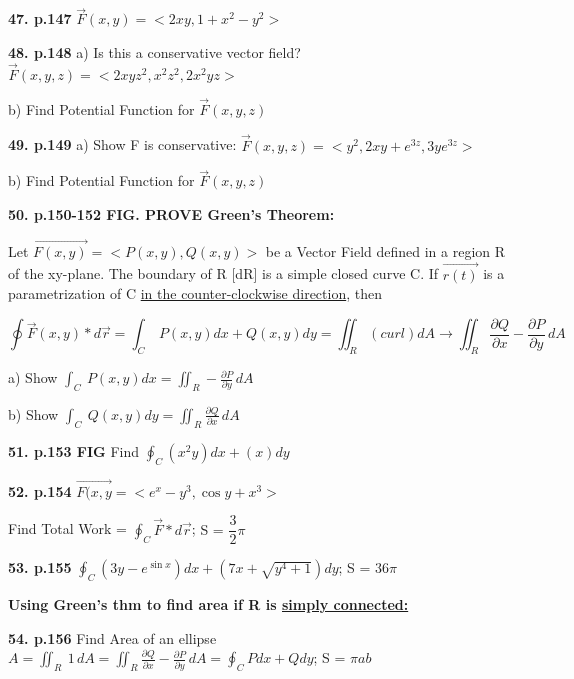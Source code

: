 \documentclass{article}
\begin{document}
\vspace{5mm}
\textbf{47. p.147} $\Vec{F}(x,y)=<2xy,1+x^2-y^2>$

\vspace{5mm}
\textbf{48. p.148} a) Is this a conservative vector field? $\Vec{F}(x,y,z)=<2xyz^2,x^2z^2,2x^2yz>$

b) Find Potential Function for $\Vec{F}(x,y,z)$

\vspace{5mm}
\textbf{49. p.149} a) Show F is conservative: $\Vec{F}(x,y,z)=<y^2,2xy+e^{3z},3ye^{3z}>$

b) Find Potential Function for $\Vec{F}(x,y,z)$

\vspace{15mm}
{\Large \textbf{50. p.150-152 FIG. PROVE Green's Theorem:}}

Let $\Vec{F(x,y)} = <P(x,y), Q(x,y)>$ be a Vector Field defined in a region R of the xy-plane. The boundary of R [dR] is a simple closed curve C. If \(\Vec{r(t)}\) is a parametrization of C \underline{in the counter-clockwise direction}, then

$$ \oint \Vec{F}(x,y) * d\Vec{r} = \int_C \ P(x,y)dx + Q(x,y)dy = \iint_R (curl) dA \xrightarrow{} \iint_R \frac{\partial Q}{\partial x} - \frac{\partial P}{\partial y} \,dA $$

\vspace{5mm}
a) Show $ \int_C \ P(x,y)dx = \iint_R - \frac{\partial P}{\partial y} \,dA$

\vspace{5mm}
b) Show $ \int_C \ Q(x,y)dy = \iint_R \frac{\partial Q}{\partial x} \,dA$

\vspace{5mm}
\textbf{51. p.153 FIG} Find $ \oint_C (x^2y)dx + (x)dy $

\vspace{5mm}
\textbf{52. p.154} \(\Vec{F(x,y} = <e^x-y^3, \cos{y} + x^3>\)


Find Total Work = $\oint_C \Vec{F} * d\Vec{r}$; {\color{blue}S = $\dfrac{3}{2}\pi$}

\vspace{5mm}
\textbf{53. p.155} $ \oint_C (3y-e^{\sin x})dx + (7x+\sqrt{y^4+1})dy $; {\color{blue}S = $36\pi$}

\vspace{5mm}
\textbf{Using Green's thm to find area if R is \underline{simply connected:}}

\vspace{5mm}
\textbf{54. p.156} Find Area of an ellipse $ A = \iint_R \ 1 \,dA = \iint_R \frac{\partial Q}{\partial x} - \frac{\partial P}{\partial y} \,dA = \oint_C Pdx + Qdy$; {\color{blue}S = $\pi ab$}
\end{document}
